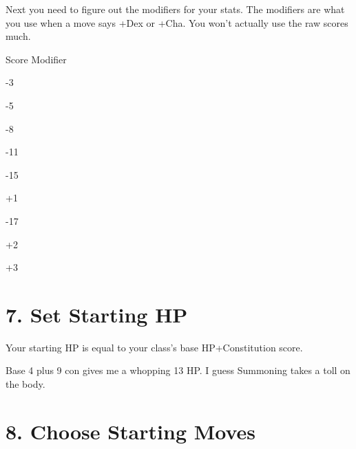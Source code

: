Next you need to figure out the modifiers for your stats. The modifiers are what you use when a move says +Dex or +Cha. You won’t actually use the raw scores much.

\bTABLE
 		
\bTR
\bTH
 			Score 			
\eTH
\bTH
Modifier
\eTH
 		
\eTR
 		
\bTR

-3
\eTD

\eTD

\eTR
 		
\bTR

-5
\eTD

\eTD

\eTR
 		
\bTR

-8
\eTD

\eTD

\eTR
 		
\bTR

-11
\eTD

\eTD

\eTR
 		
\bTR

-15
\eTD

\bTD
+1
\eTD

\eTR
 		
\bTR

-17
\eTD

\bTD
+2
\eTD

\eTR
 		
\bTR

\eTD

\bTD
+3
\eTD

\eTR
 	  
\eTABLE
        


\section{7. Set Starting HP}     
 

Your starting HP is equal to your class's base HP+Constitution score.

 
\startExample
Base 4 plus 9 con gives me a whopping 13 HP. I guess Summoning takes a toll on the body.
\stopExample
 
\section{8. Choose Starting Moves}     
 

